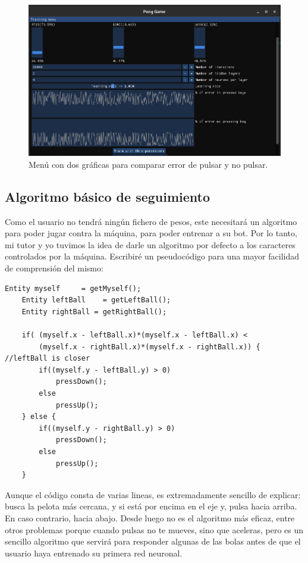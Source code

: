 \begin{figure}[H]
	\centering
	\includegraphics[width=15cm]{archivos/imagenes/menu-de-entrenamiento-dos-graficas.png}
	\caption{Menú con dos gráficas para comparar error de pulsar y no pulsar.}
	\label{menu dos graficas}
\end{figure}

\subsection{Algoritmo básico de seguimiento}
Como el usuario no tendrá ningún fichero de pesos, este necesitará un algoritmo para poder jugar contra la máquina, para poder entrenar a su bot. Por lo tanto, mi tutor y yo tuvimos la idea de darle un algoritmo por defecto a los caracteres controlados por la máquina. Escribiré un pseudocódigo para una mayor facilidad de comprensión del mismo:
\begin{lstlisting}[style=C-color, caption={Pseudocódigo de algoritmo de IA diseñada},label=pseudo-code-ia-designed]
	Entity myself     = getMyself();
	Entity leftBall    = getLeftBall();
	Entity rightBall = getRightBall();
	
	if( (myself.x - leftBall.x)*(myself.x - leftBall.x) < 
		(myself.x - rightBall.x)*(myself.x - rightBall.x)) { //leftBall is closer
		if((myself.y - leftBall.y) > 0)
			pressDown();
		else
			pressUp();
	} else {
		if((myself.y - rightBall.y) > 0)
			pressDown();
		else
			pressUp();
	}
\end{lstlisting}
Aunque el código consta de varias lineas, es extremadamente sencillo de explicar: busca la pelota más cercana, y si está por encima en el eje y, pulsa hacia arriba. En caso contrario, hacia abajo. Desde luego no es el algoritmo más eficaz, entre otros problemas porque cuando pulsas no te mueves, sino que aceleras, pero es un sencillo algoritmo que servirá para responder algunas de las bolas antes de que el usuario haya entrenado su primera red neuronal.
 
